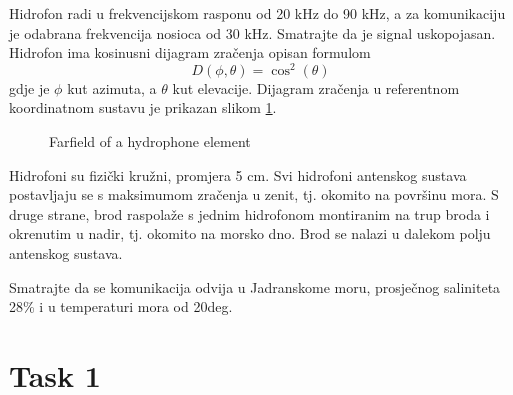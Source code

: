 \documentclass{article}[a4paper]
\begin{document}
Hidrofon radi u frekvencijskom rasponu od 20 kHz do 90 kHz, a za komunikaciju je odabrana frekvencija nosioca od 30 kHz. Smatrajte da je signal uskopojasan. Hidrofon ima kosinusni dijagram zračenja opisan formulom
\[ D(\phi,\theta) = \cos^2(\theta) \]
gdje je $\phi$ kut azimuta, a $\theta$ kut elevacije. Dijagram zračenja u referentnom koordinatnom sustavu je prikazan slikom \ref{fig:hydrophone}.
\begin{figure}[h!]
   \centering
   \hfill
   \caption{Farfield of a hydrophone element}
   \label{fig:hydrophone}
\end{figure}
Hidrofoni su fizički kružni, promjera 5 cm. Svi hidrofoni antenskog sustava postavljaju se s maksimumom zračenja u zenit, tj. okomito na površinu mora. S druge strane, brod raspolaže s jednim hidrofonom montiranim na trup broda i okrenutim u nadir, tj. okomito na morsko dno. Brod se nalazi u dalekom polju antenskog sustava.

Smatrajte da se komunikacija odvija u Jadranskome moru, prosječnog saliniteta 28\% i u temperaturi mora od 20deg.

\pagebreak

\section*{Task 1}
\end{document}
